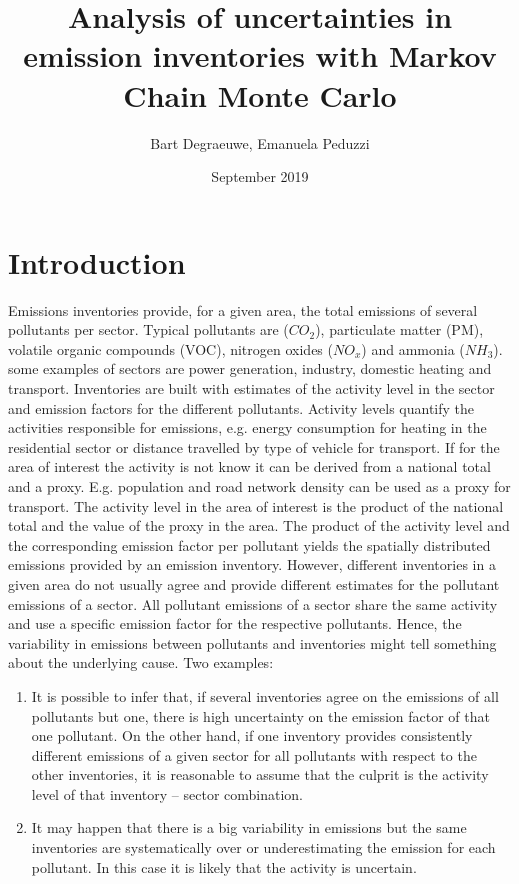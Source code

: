 \documentclass{article}
\title{Analysis of uncertainties in emission inventories with Markov Chain Monte Carlo}
\author{Bart Degraeuwe, Emanuela Peduzzi}
\date{September 2019}
\begin{document}
\maketitle

\section{Introduction}
Emissions inventories provide, for a given area, the total emissions of several pollutants per sector. Typical pollutants are (\(CO_{2}\)), particulate matter (PM), volatile organic compounds (VOC), nitrogen oxides (\(NO_{x}\)) and ammonia (\(NH_{3}\)). some examples of sectors are power generation, industry, domestic heating and transport. Inventories are built with estimates of the activity level in the sector and emission factors for the different pollutants. Activity levels quantify the activities responsible for emissions, e.g. energy consumption for heating in the residential sector or distance travelled by type of vehicle for transport. If for the area of interest the activity is not know it can be derived from a national total and a proxy. E.g. population and road network density can be used as a proxy for transport. The activity level in the area of interest is the product of the national total and the value of the proxy in the area. The product of the activity level and the corresponding emission factor per pollutant yields the spatially distributed emissions provided by an emission inventory. 
However, different inventories in a given area do not usually agree and provide different estimates for the pollutant emissions of a sector. All pollutant emissions of a sector share the same activity and use a specific emission factor for the respective pollutants. Hence, the variability in emissions between pollutants and inventories might tell something about the underlying cause. Two examples:
\begin{enumerate}
\item It is possible to infer that, if several inventories agree on the emissions of all pollutants but one, there is high uncertainty on the emission factor of that one pollutant. On the other hand, if one inventory provides consistently different emissions of a given sector for all pollutants with respect to the other inventories, it is reasonable to assume that the culprit is the activity level of that inventory – sector combination.
\item It may happen that there is a big variability in emissions but the same inventories are systematically over or underestimating the emission for each pollutant. In this case it is likely that the activity is uncertain.
\end{enumerate}
\end{document}
